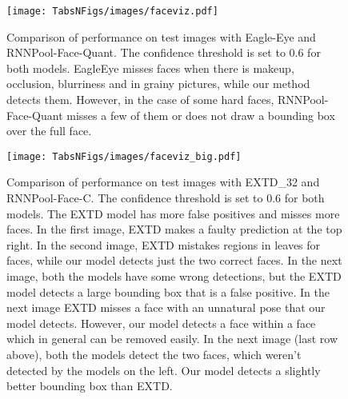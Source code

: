 \documentclass[10pt]{article}
\begin{document}
\begin{figure}[h!]
\begin{minipage}{.5\columnwidth}
\centering
	\texttt{[image: TabsNFigs/images/faceviz.pdf]}
	\caption{\small Comparison of performance on test images with
          Eagle-Eye and RNNPool-Face-Quant. The confidence threshold
          is set to 0.6 for both models. EagleEye misses faces when
          there is makeup, occlusion, blurriness and in grainy
          pictures, while our method detects them. However, in the
          case of some hard faces, RNNPool-Face-Quant misses a few of
          them or does not draw a bounding box over the full face.}
	\label{fig:faceviz}
	\end{minipage}
	\quad
\begin{minipage}{.5\columnwidth}
\centering
	\texttt{[image: TabsNFigs/images/faceviz\_big.pdf]}
	\caption{\small Comparison of performance on test images with
          EXTD\_32 and RNNPool-Face-C. The confidence threshold is set
          to 0.6 for both models. The EXTD model has more false
          positives and misses more faces. In the first image, EXTD
          makes a faulty prediction at the top right. In the second
          image, EXTD mistakes regions in leaves for faces, while our
          model detects just the two correct faces. In the next image,
          both the models have some wrong detections, but the EXTD
          model detects a large bounding box that is a false
          positive. In the next image EXTD misses a face with an
          unnatural pose that our model detects. However, our model
          detects a face within a face which in general can be removed
          easily. In the next image (last row above), both the models
          detect the two faces, which weren't detected by the models
          on the left. Our model detects a slightly better bounding
          box than EXTD.  }
	\label{fig:faceviz_big}
		\end{minipage}
\end{figure}
 

 




 
\end{document}
